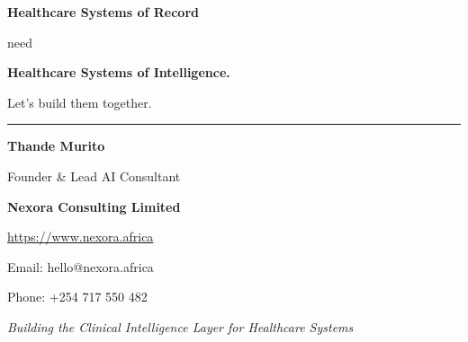 \vspace{8mm}

\begin{callout}

\centering

\Huge

\textbf{Healthcare Systems of Record}

\vspace{3mm}

\Large

need

\vspace{3mm}

\Huge

\textbf{Healthcare Systems of Intelligence.}

\vspace{8mm}

\Large

Let's build them together.

\end{callout}

\vfill


\hrule

\vspace{8mm}

\begin{center}

{\Large\textbf{Thande Murito}}

\vspace{2mm}

Founder \& Lead AI Consultant

\vspace{2mm}

\textbf{Nexora Consulting Limited}

\vspace{5mm}

\url{https://www.nexora.africa}

\vspace{2mm}

Email: hello@nexora.africa

\vspace{2mm}

Phone: +254 717 550 482

\vspace{8mm}

\textit{Building the Clinical Intelligence Layer for Healthcare Systems}

\end{center}

